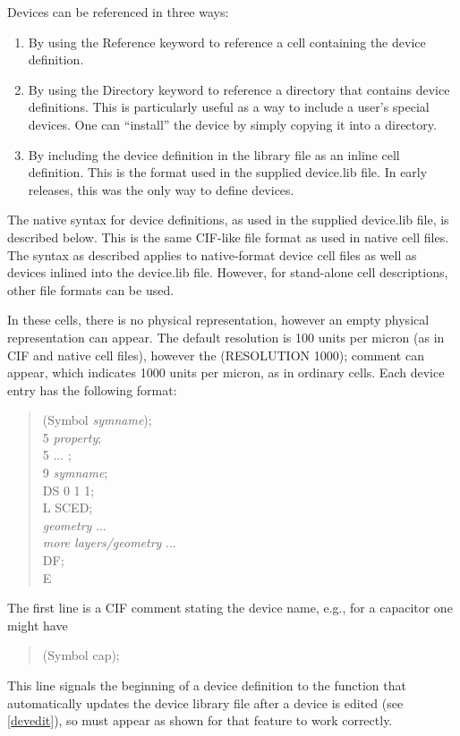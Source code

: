 Devices can be referenced in three ways:
\begin{enumerate}
\item{By using the {\vt Reference} keyword to reference a cell
containing the device definition.}

\item{By using the {\vt Directory} keyword to reference a directory
that contains device definitions.  This is particularly useful as a
way to include a user's special devices.  One can ``install'' the
device by simply copying it into a directory.}

\item{By including the device definition in the library file as an
inline cell definition.  This is the format used in the supplied {\vt
device.lib} file.  In early {\Xic} releases, this was the only way to
define devices.}
\end{enumerate}

The native syntax for device definitions, as used in the supplied {\vt
device.lib} file, is described below.  This is the same CIF-like file
format as used in native cell files.  The syntax as described applies
to native-format device cell files as well as devices inlined into the
{\vt device.lib} file.  However, for stand-alone cell descriptions,
other file formats can be used.

In these cells, there is no physical representation, however an empty
physical representation can appear.  The default resolution is 100
units per micron (as in CIF and native cell files), however the {\vt
(RESOLUTION 1000);} comment can appear, which indicates 1000 units per
micron, as in ordinary cells.  Each device entry has the following
format:

\begin{quote}{\vt}
(Symbol {\it symname\/});\\
5 {\it property\/};\\
5 ... ;\\
9 {\it symname\/};\\
DS 0 1 1;\\
L SCED;\\
{\it geometry\/} ...\\
{\it more layers/geometry\/} ...\\
DF;\\
E
\end{quote}

The first line is a CIF comment stating the device name, e.g., for a
capacitor one might have
\begin{quote}
{\vt (Symbol cap);}
\end{quote}
This line signals the beginning of a device definition to the function
that automatically updates the device library file after a device is
edited (see \ref{devedit}), so must appear as shown for that feature
to work correctly.

